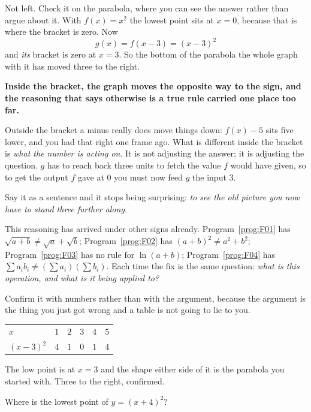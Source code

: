 \begin{fr}
Not left. Check it on the parabola, where you can see the answer rather than
argue about it. With $f(x) = x^{2}$ the lowest point sits at $x = 0$, because
that is where the bracket is zero. Now
\[ g(x) = f(x - 3) = (x - 3)^{2} \]
and \emph{its} bracket is zero at $x = 3$. So the bottom of the parabola \dash{}
the whole graph with it \dash{} has moved three to the right.

\begin{trapbox}
\textbf{Inside the bracket, the graph moves the opposite way to the sign, and
the reasoning that says otherwise is a true rule carried one place too far.}

Outside the bracket a minus really does move things down: $f(x) - 5$ sits five
lower, and you had that right one frame ago. What is different inside the
bracket is \emph{what the number is acting on}. It is not adjusting the answer;
it is adjusting the question. $g$ has to reach back three units to fetch the
value $f$ would have given, so to get the output $f$ gave at $0$ you must now
feed $g$ the input $3$.

Say it as a sentence and it stops being surprising: \emph{to see the old
picture you now have to stand three further along.}

This reasoning has arrived under other signs already. Program~\ref{prog:F01}
has $\sqrt{a+b} \ne \sqrt{a} + \sqrt{b}$; Program~\ref{prog:F02} has
$(a+b)^{2} \ne a^{2} + b^{2}$; Program~\ref{prog:F03} has no rule for
$\ln(a+b)$; Program~\ref{prog:F04} has
$\sum a_i b_i \ne (\sum a_i)(\sum b_i)$. Each time the fix is the same
question: \emph{what is this operation, and what is it being applied to?}
\end{trapbox}
\end{fr}

\begin{fr}
Confirm it with numbers rather than with the argument, because the argument is
the thing you just got wrong and a table is not going to lie to you.

\begin{center}
\begin{tabular}{lccccc}
\toprule
$x$ & $1$ & $2$ & $3$ & $4$ & $5$ \\
$(x - 3)^{2}$ & $4$ & $1$ & $0$ & $1$ & $4$ \\
\bottomrule
\end{tabular}
\end{center}

The low point is at $x = 3$ and the shape either side of it is the parabola you
started with. Three to the right, confirmed.

Where is the lowest point of $y = (x + 4)^{2}$?
\nextframe
\end{fr}


